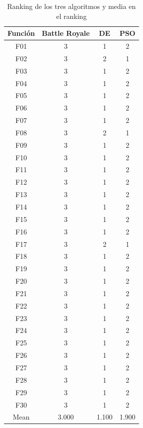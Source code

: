 \documentclass[11pt]{article}
\begin{document}
\begin{table}[H]
\centering
\begin{tabular}{|c|c|c|c|}
\hline
\textbf{Función} & \textbf{Battle Royale} &         \textbf{DE} &        \textbf{PSO} \\
\hline
F01  &             3 &      1 &      2 \\
F02  &             3 &      2 &      1 \\
F03  &             3 &      1 &      2 \\
F04  &             3 &      1 &      2 \\
F05  &             3 &      1 &      2 \\
F06  &             3 &      1 &      2 \\
F07  &             3 &      1 &      2 \\
F08  &             3 &      2 &      1 \\
F09  &             3 &      1 &      2 \\
F10  &             3 &      1 &      2 \\
F11  &             3 &      1 &      2 \\
F12  &             3 &      1 &      2 \\
F13  &             3 &      1 &      2 \\
F14  &             3 &      1 &      2 \\
F15  &             3 &      1 &      2 \\
F16  &             3 &      1 &      2 \\
F17  &             3 &      2 &      1 \\
F18  &             3 &      1 &      2 \\
F19  &             3 &      1 &      2 \\
F20  &             3 &      1 &      2 \\
F21  &             3 &      1 &      2 \\
F22  &             3 &      1 &      2 \\
F23  &             3 &      1 &      2 \\
F24  &             3 &      1 &      2 \\
F25  &             3 &      1 &      2 \\
F26  &             3 &      1 &      2 \\
F27  &             3 &      1 &      2 \\
F28  &             3 &      1 &      2 \\
F29  &             3 &      1 &      2 \\
F30  &             3 &      1 &      2 \\
Mean &         3.000 &  1.100 &  1.900 \\
\hline
\end{tabular}
    \caption{Ranking de los tres algoritmos y media en el ranking}
\end{table}
\end{document}
